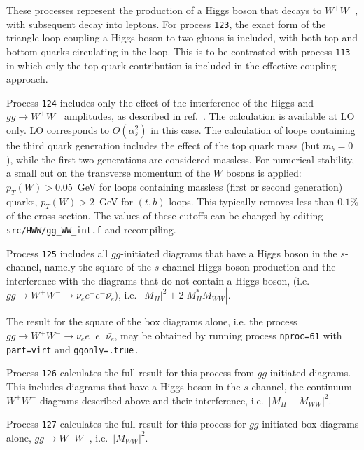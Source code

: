These processes represent the production of a Higgs boson that decays to $W^+ W^-$,
with subsequent decay into leptons. For process {\tt 123}, the exact form of the triangle
loop coupling a Higgs boson to two gluons is included, with both top and bottom quarks
circulating in the loop. This is to be contrasted with process {\tt 113} in which only the
top quark contribution is included in the effective coupling approach.

Process {\tt 124} includes only the effect of the interference of the
Higgs and $gg \to W^+W^-$ amplitudes, as described in ref.~\cite{Campbell:2011cu}.
The calculation is available at LO only. LO corresponds to $O(\alpha_s^2)$ in this case.
The calculation of loops containing the third quark generation
includes the effect of the top quark mass (but $m_b=0$), while the first two
generations are considered massless. For numerical stability, a small cut on the
transverse momentum of the $W$ bosons is applied: $p_T(W)>0.05$~GeV for loops
containing massless (first or second generation) quarks, $p_T(W)>2$~GeV for $(t,b)$
loops. This typically removes less than $0.1$\% of the cross section. The
values of these cutoffs can be changed by editing \verb|src/HWW/gg_WW_int.f| and recompiling.

Process {\tt 125} includes all $gg$-initiated diagrams that have a Higgs boson in the $s$-channel,
namely the square of the $s$-channel Higgs boson production and the interference with the diagrams
that do not contain a Higgs boson, (i.e. $gg \to W^+W^- \to \nu_e e^+ e^- \bar{\nu_e}$),
i.e.~$|M_H|^2+2 |M_H^* M_{WW}|$.

The result for the square of the box diagrams alone, i.e. the process
$gg \to W^+W^- \to \nu_e e^+ e^- \bar{\nu_e}$, may be obtained by running process
{\tt nproc=61} with {\tt part=virt} and {\tt ggonly=.true.}

Process {\tt 126} calculates the full result for this process from  $gg$-initiated diagrams.
This includes diagrams that have a Higgs boson in the $s$-channel, the continuum $W^+W^-$
diagrams described above and their interference, i.e.~$|M_{H}+M_{WW}|^2$.

Process {\tt 127} calculates the full result for this process for  $gg$-initiated box
diagrams alone, $gg \to W^+W^-$, i.e.~$|M_{WW}|^2$.
